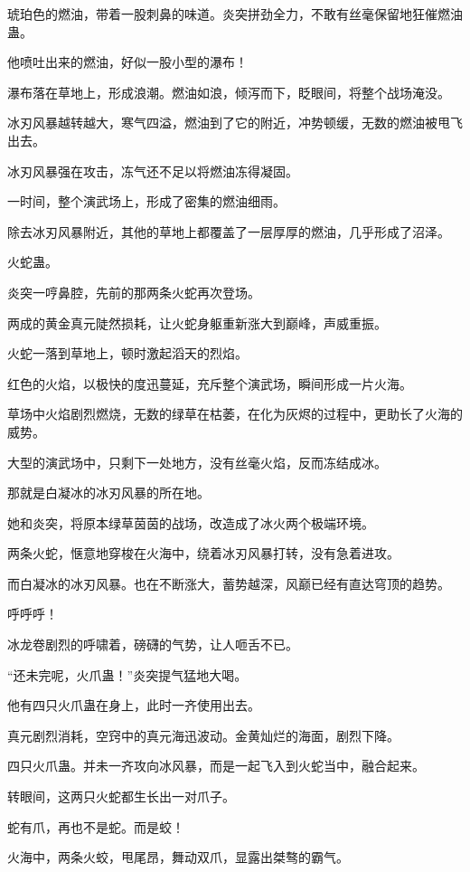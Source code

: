 \begin{this_body}
琥珀色的燃油，带着一股刺鼻的味道。炎突拼劲全力，不敢有丝毫保留地狂催燃油蛊。

他喷吐出来的燃油，好似一股小型的瀑布！

瀑布落在草地上，形成浪潮。燃油如浪，倾泻而下，眨眼间，将整个战场淹没。

冰刃风暴越转越大，寒气四溢，燃油到了它的附近，冲势顿缓，无数的燃油被甩飞出去。

冰刃风暴强在攻击，冻气还不足以将燃油冻得凝固。

一时间，整个演武场上，形成了密集的燃油细雨。

除去冰刃风暴附近，其他的草地上都覆盖了一层厚厚的燃油，几乎形成了沼泽。

火蛇蛊。

炎突一哼鼻腔，先前的那两条火蛇再次登场。

两成的黄金真元陡然损耗，让火蛇身躯重新涨大到巅峰，声威重振。

火蛇一落到草地上，顿时激起滔天的烈焰。

红色的火焰，以极快的度迅蔓延，充斥整个演武场，瞬间形成一片火海。

草场中火焰剧烈燃烧，无数的绿草在枯萎，在化为灰烬的过程中，更助长了火海的威势。

大型的演武场中，只剩下一处地方，没有丝毫火焰，反而冻结成冰。

那就是白凝冰的冰刃风暴的所在地。

她和炎突，将原本绿草茵茵的战场，改造成了冰火两个极端环境。

两条火蛇，惬意地穿梭在火海中，绕着冰刃风暴打转，没有急着进攻。

而白凝冰的冰刃风暴。也在不断涨大，蓄势越深，风巅已经有直达穹顶的趋势。

呼呼呼！

冰龙卷剧烈的呼啸着，磅礴的气势，让人咂舌不已。

“还未完呢，火爪蛊！”炎突提气猛地大喝。

他有四只火爪蛊在身上，此时一齐使用出去。

真元剧烈消耗，空窍中的真元海迅波动。金黄灿烂的海面，剧烈下降。

四只火爪蛊。并未一齐攻向冰风暴，而是一起飞入到火蛇当中，融合起来。

转眼间，这两只火蛇都生长出一对爪子。

蛇有爪，再也不是蛇。而是蛟！

火海中，两条火蛟，甩尾昂，舞动双爪，显露出桀骜的霸气。


\end{this_body}

